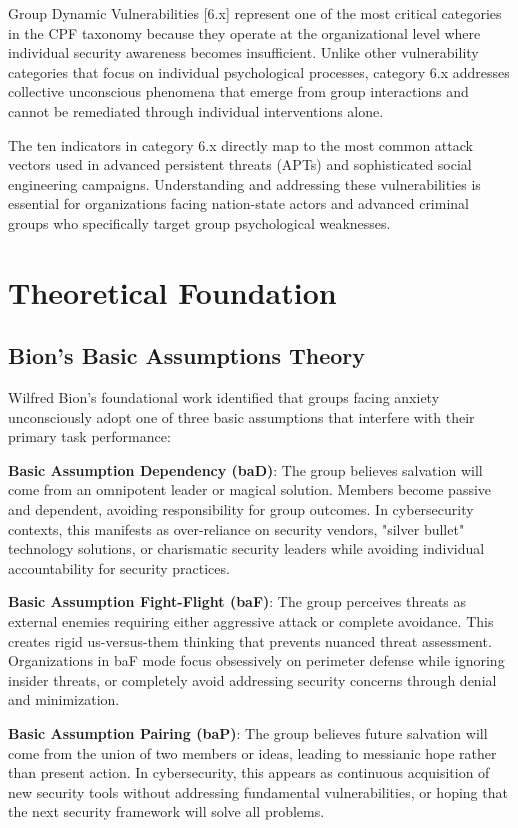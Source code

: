 \documentclass[11pt,a4paper]{article}
\begin{document}
Group Dynamic Vulnerabilities [6.x] represent one of the most critical categories in the CPF taxonomy because they operate at the organizational level where individual security awareness becomes insufficient. Unlike other vulnerability categories that focus on individual psychological processes, category 6.x addresses collective unconscious phenomena that emerge from group interactions and cannot be remediated through individual interventions alone.

The ten indicators in category 6.x directly map to the most common attack vectors used in advanced persistent threats (APTs) and sophisticated social engineering campaigns. Understanding and addressing these vulnerabilities is essential for organizations facing nation-state actors and advanced criminal groups who specifically target group psychological weaknesses.

\section{Theoretical Foundation}

\subsection{Bion's Basic Assumptions Theory}

Wilfred Bion's foundational work \cite{bion1961} identified that groups facing anxiety unconsciously adopt one of three basic assumptions that interfere with their primary task performance:

\textbf{Basic Assumption Dependency (baD)}: The group believes salvation will come from an omnipotent leader or magical solution. Members become passive and dependent, avoiding responsibility for group outcomes. In cybersecurity contexts, this manifests as over-reliance on security vendors, "silver bullet" technology solutions, or charismatic security leaders while avoiding individual accountability for security practices.

\textbf{Basic Assumption Fight-Flight (baF)}: The group perceives threats as external enemies requiring either aggressive attack or complete avoidance. This creates rigid us-versus-them thinking that prevents nuanced threat assessment. Organizations in baF mode focus obsessively on perimeter defense while ignoring insider threats, or completely avoid addressing security concerns through denial and minimization.

\textbf{Basic Assumption Pairing (baP)}: The group believes future salvation will come from the union of two members or ideas, leading to messianic hope rather than present action. In cybersecurity, this appears as continuous acquisition of new security tools without addressing fundamental vulnerabilities, or hoping that the next security framework will solve all problems.
\end{document}
